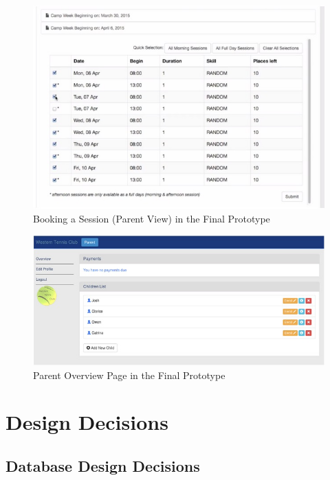 \documentclass{l3proj}
\begin{document}
{
\begin{figure}[h]
\caption{Booking a Session (Parent View) in the Final Prototype}
\centering
\includegraphics[scale=0.55]{parenttableFinal.jpg}
\end{figure}
}
{
\begin{figure}[h]
\caption{Parent Overview Page in the Final Prototype}
\centering
\includegraphics[scale=0.55]{parentlistofchildren.jpg}
\end{figure}
}
\section{Design Decisions}

\subsection{Database Design Decisions}

\end{document}
